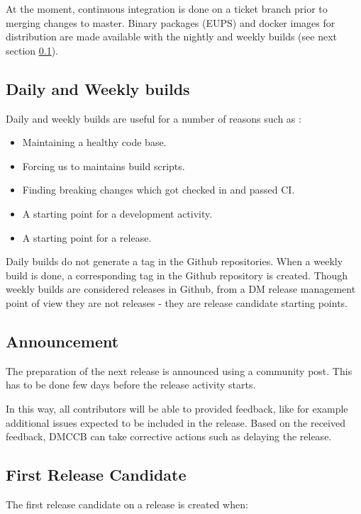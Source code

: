 At the moment, continuous integration is done on a ticket branch prior to merging changes to master. Binary packages (EUPS) and docker images for distribution are made available with the nightly and weekly builds (see next section \ref{sec:weekly}).


\subsection{Daily and Weekly builds} \label{sec:weekly}

Daily and weekly builds are  useful for a number of reasons such as :
\begin{itemize}
	\item Maintaining a healthy code base.
	\item Forcing us to maintains build scripts.
	\item Finding breaking changes which got checked in and passed CI.
	\item A starting point for a development activity.
	\item A starting point for a release.
\end{itemize}

Daily builds do not generate a tag in the Github repositories.
When a weekly build is done, a corresponding tag in the Github repository is created.
Though weekly builds are considered releases in Github, from a DM release management point of view they are not
releases - they are release candidate starting points.


\subsection{Announcement} \label{sec:anaouncement}

The preparation of the next release is announced using a community post.
This has to be done few days before the release activity starts.

In this way, all contributors will be able to provided feedback, like for example additional issues expected to be included in the release.
Based on the received feedback, DMCCB can take corrective actions such as delaying the release.


\subsection{First Release Candidate} \label{sec:firstrc}

The first release candidate on a release is created when:

